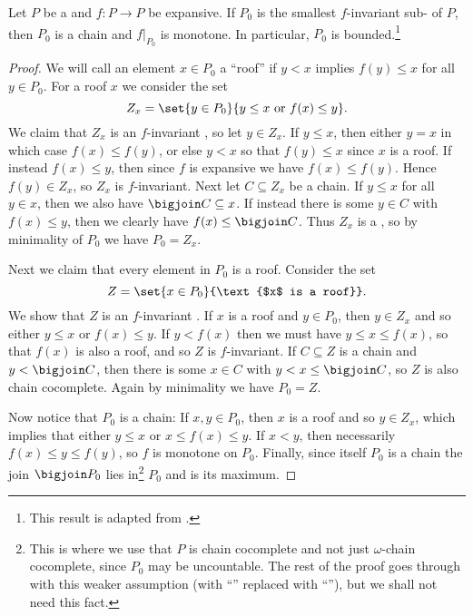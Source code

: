 \begin{lemma}
    \label{lem:expansive-gives-monotone}
    Let $P$ be a \cCPPO{} and $f \colon P \to P$ be expansive. If $P_0$ is the smallest $f$-invariant sub-\cCPPO{} of $P$, then $P_0$ is a chain and $f|_{P_0}$ is monotone. In particular, $P_0$ is bounded.\footnote{This result is adapted from \textcite[Exercise~8.20]{davey-priestley-order}.}
\end{lemma}

\begin{proof}
    We will call an element $x \in P_0$ a \enquote{roof} if $y < x$ implies $f(y) \leq x$ for all $y \in P_0$. For a roof $x$ we consider the set
    \begin{equation*}
        Z_x
            = \set{y \in P_0}{y \leq x \text{ or } f(x) \leq y}.
    \end{equation*}
    We claim that $Z_x$ is an $f$-invariant \cCPPO, so let $y \in Z_x$. If $y \leq x$, then either $y = x$ in which case $f(x) \leq f(y)$, or else $y < x$ so that $f(y) \leq x$ since $x$ is a roof. If instead $f(x) \leq y$, then since $f$ is expansive we have $f(x) \leq f(y)$. Hence $f(y) \in Z_x$, so $Z_x$ is $f$-invariant. Next let $C \subseteq Z_x$ be a chain. If $y \leq x$ for all $y \in x$, then we also have $\bigjoin C \subseteq x$. If instead there is some $y \in C$ with $f(x) \leq y$, then we clearly have $f(x) \leq \bigjoin C$. Thus $Z_x$ is a \cCPPO, so by minimality of $P_0$ we have $P_0 = Z_x$.

    Next we claim that every element in $P_0$ is a roof. Consider the set
    \begin{equation*}
        Z
            = \set{x \in P_0}{\text{$x$ is a roof}}.
    \end{equation*}
    We show that $Z$ is an $f$-invariant \cCPPO. If $x$ is a roof and $y \in P_0$, then $y \in Z_x$ and so either $y \leq x$ or $f(x) \leq y$. If $y < f(x)$ then we must have $y \leq x \leq f(x)$, so that $f(x)$ is also a roof, and so $Z$ is $f$-invariant. If $C \subseteq Z$ is a chain and $y < \bigjoin C$, then there is some $x \in C$ with $y < x \leq \bigjoin C$, so $Z$ is also chain cocomplete. Again by minimality we have $P_0 = Z$.

    Now notice that $P_0$ is a chain: If $x,y \in P_0$, then $x$ is a roof and so $y \in Z_x$, which implies that either $y \leq x$ or $x \leq f(x) \leq y$. If $x < y$, then necessarily $f(x) \leq y \leq f(y)$, so $f$ is monotone on $P_0$. Finally, since itself $P_0$ is a chain the join $\bigjoin P_0$ lies in\footnote{This is where we use that $P$ is chain cocomplete and not just $\omega$-chain cocomplete, since $P_0$ may be uncountable. The rest of the proof goes through with this weaker assumption (with \enquote{\cCPPO} replaced with \enquote{\oCPPO}), but we shall not need this fact.} $P_0$ and is its maximum.
\end{proof}



